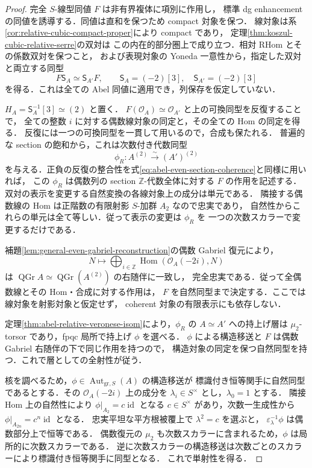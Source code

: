 \begin{proof}
完全 $S$-線型同値 $F$ は非有界複体に項別に作用し，
標準 dg enhancement の同値を誘導する．同値は直和を保つため compact 対象を保つ．
線対象は系\ref{cor:relative-cubic-compact-proper}により compact であり，
定理\ref{thm:koszul-cubic-relative-serre}の双対は
この内在的部分圏上で成り立つ．相対 RHom とその係数双対を保つこと，
および表現対象の Yoneda 一意性から，指定した双対と両立する同型
\[
 F\mathsf S_A\simeq\mathsf S_{A'}F,
 \qquad \mathsf S_A=(-2)[3],\quad\mathsf S_{A'}=(-2)[3]
\]
を得る．これは全ての Abel 同値に適用でき，列保存を仮定していない．

$H_A=\mathsf S_A^{-1}[3]\simeq(2)$ と置く．
$F(\mathcal O_A)\simeq\mathcal O_{A'}$ と上の可換同型を反復することで，
全ての整数 $i$ に対する偶数線対象の同定と，その全ての Hom の同定を得る．
反復には一つの可換同型を一貫して用いるので，合成も保たれる．
普遍的な section の飽和から，これは次数付き代数同型
\[
 \phi_R:A^{(2)}\xrightarrow{\sim}(A')^{(2)}
\]
を与える．正負の反復の整合性を式\eqref{eq:abel-even-section-coherence}と同様に用いれば，
この $\phi_R$ は偶数列の section $\mathbb Z$-代数全体に対する $F$ の作用を記述する．
双対の表示を変更する自然変換の各線対象上の成分は単元である．
隣接する偶数線の Hom は正階数の有限射影 $S$-加群 $A_2$ なので忠実であり，
自然性からこれらの単元は全て等しい．従って表示の変更は $\phi_R$ を
一つの次数スカラーで変更するだけである．

補題\ref{lem:general-even-gabriel-reconstruction}の偶数 Gabriel 復元により，
\[
 N\longmapsto\bigoplus_{i\in\mathbb Z}
   \operatorname{Hom}(\mathcal O_A(-2i),N)
\]
は $\operatorname{QGr}A\simeq\operatorname{QGr}(A^{(2)})$ の右随伴に一致し，
完全忠実である．従って全偶数線とその Hom・合成に対する作用は，
$F$ を自然同型まで決定する．ここでは線対象を射影対象と仮定せず，
coherent 対象の有限表示にも依存しない．

定理\ref{thm:abel-relative-veronese-isom}により，$\phi_R$ の
$A\simeq A'$ への持上げ層は $\mu_2$-torsor であり，fpqc 局所で持上げ $\phi$ を選べる．
$\phi$ による構造移送と $F$ は偶数 Gabriel 右随伴の下で同じ作用を持つので，
構造対象の同定を保つ自然同型を持つ．これで層としての全射性が従う．

核を調べるため，$\phi\in\operatorname{Aut}_{\mathrm{gr},S}(A)$ の構造移送が
標識付き恒等関手に自然同型であるとする．その $\mathcal O_A(-2i)$ 上の成分を
$\lambda_i\in S^\times$ とし，$\lambda_0=1$ とする．
隣接 Hom 上の自然性により $\phi|_{A_2}=c\operatorname{id}$ となる
$c\in S^\times$ があり，次数一生成性から
$\phi|_{A_{2n}}=c^n\operatorname{id}$ となる．
忠実平坦な平方根被覆上で $\lambda^2=c$ を選ぶと，
$\varepsilon_\lambda^{-1}\phi$ は偶数部分上で恒等である．
偶数復元の $\mu_2$ も次数スカラーに含まれるため，$\phi$ は局所的に次数スカラーである．
逆に次数スカラーの構造移送は次数ごとのスカラーにより標識付き恒等関手に同型となる．
これで単射性を得る．


\end{proof}
